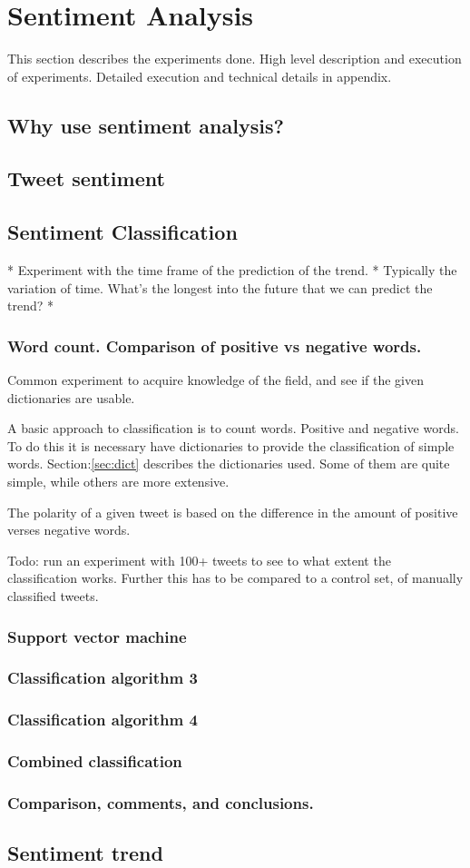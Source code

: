 
\chapter{Sentiment Analysis}
This section describes the experiments done. High level description and
execution of experiments. Detailed execution and technical details in appendix. 

\section{Why use sentiment analysis?}
\section{Tweet sentiment}

\section{Sentiment Classification}

* Experiment with the time frame of the prediction of the trend. 
	* Typically the variation of time. What's the longest into the future that
we can predict the trend?
* 

\subsection{Word count. Comparison of positive vs negative words.} 
Common experiment to acquire knowledge of the field, and see if the given
dictionaries are usable. 

A basic approach to classification is to count words. Positive and negative
words. To do this it is necessary have dictionaries to provide the
classification of simple words. Section:\ref{sec:dict} describes the
dictionaries used. Some of them are quite simple, while others are more
extensive. 

The polarity of a given tweet is based on the difference in the amount of
positive verses negative words. 

Todo: run an experiment with 100+ tweets to see to what extent the
classification works. Further this has to be compared to a control set, of
manually classified tweets.  

\subsection{Support vector machine}


\subsection{Classification algorithm 3}
\subsection{Classification algorithm 4}
\subsection{Combined classification}
\subsection{Comparison, comments, and conclusions.}


\section{Sentiment trend}
